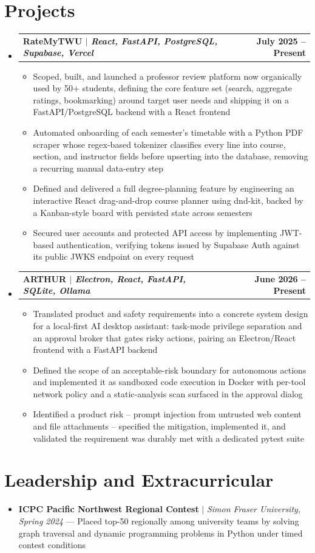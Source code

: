 \documentclass[letterpaper,10pt]{article}
\makeatletter
\newcommand{\resumeItem}[1]{\item\small{#1 \vspace{-2pt}}}
\newcommand{\resumeSkill}[1]{\item[]\small{#1 \vspace{-2pt}}}
\newcommand{\resumeProjectHeading}[2]{%
  \item[]
    \begin{tabular*}{1.001\textwidth}{l@{\extracolsep{\fill}}r}
      \textbf{#1} & \textbf{\small #2}\\
    \end{tabular*}\vspace{-4pt}
}
\newcommand{\resumeSubHeadingListStart}{\begin{itemize}[leftmargin=0in, itemsep=0pt]}
\newcommand{\resumeSubHeadingListEnd}{\end{itemize}}
\newcommand{\resumeItemListStart}{\begin{itemize}[leftmargin=0.18in, label=\raisebox{0.2ex}{\scriptsize\textbullet}, itemsep=0pt, topsep=4pt]}
\newcommand{\resumeItemListEnd}{\end{itemize}\vspace{-2pt}}
\makeatother
\begin{document}
\section{Projects}
\resumeSubHeadingListStart
\resumeProjectHeading
  {\textbf{RateMyTWU} $|$ \emph{React, FastAPI, PostgreSQL, Supabase, Vercel}}{July 2025 -- Present}
\resumeItemListStart
    \resumeItem{Scoped, built, and launched a professor review platform now organically used by 50+ students, defining the core feature set (search, aggregate ratings, bookmarking) around target user needs and shipping it on a FastAPI/PostgreSQL backend with a React frontend}
    \resumeItem{Automated onboarding of each semester's timetable with a Python PDF scraper whose regex-based tokenizer classifies every line into course, section, and instructor fields before upserting into the database, removing a recurring manual data-entry step}
    \resumeItem{Defined and delivered a full degree-planning feature by engineering an interactive React drag-and-drop course planner using dnd-kit, backed by a Kanban-style board with persisted state across semesters}
    \resumeItem{Secured user accounts and protected API access by implementing JWT-based authentication, verifying tokens issued by Supabase Auth against its public JWKS endpoint on every request}
\resumeItemListEnd
\resumeProjectHeading
  {\textbf{ARTHUR} $|$ \emph{Electron, React, FastAPI, SQLite, Ollama}}{June 2026 -- Present}
\resumeItemListStart
    \resumeItem{Translated product and safety requirements into a concrete system design for a local-first AI desktop assistant: task-mode privilege separation and an approval broker that gates risky actions, pairing an Electron/React frontend with a FastAPI backend}
    \resumeItem{Defined the scope of an acceptable-risk boundary for autonomous actions and implemented it as sandboxed code execution in Docker with per-tool network policy and a static-analysis scan surfaced in the approval dialog}
    \resumeItem{Identified a product risk -- prompt injection from untrusted web content and file attachments -- specified the mitigation, implemented it, and validated the requirement was durably met with a dedicated pytest suite}
\resumeItemListEnd
\resumeSubHeadingListEnd
\vspace{-5pt}
\section{Leadership and Extracurricular}
\resumeSubHeadingListStart
    \resumeSkill{\textbf{ICPC Pacific Northwest Regional Contest} $|$ \emph{Simon Fraser University, Spring 2024} --- Placed top-50 regionally among university teams by solving graph traversal and dynamic programming problems in Python under timed contest conditions}
\resumeSubHeadingListEnd
\end{document}
